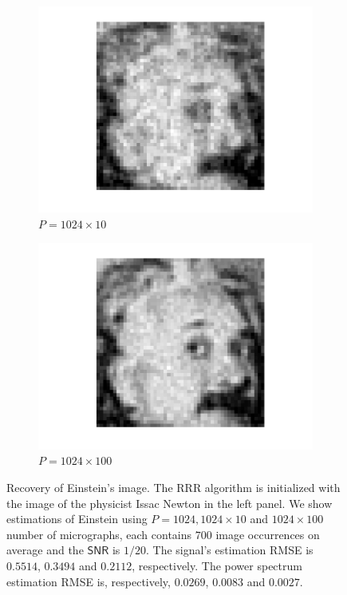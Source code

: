 \documentclass[english,11pt]{article}
\newcommand{\TODO}[1]{{\color{red}{[#1]}}}
\numberwithin{equation}{section}
\theoremstyle{plain}
\theoremstyle{definition}
\theoremstyle{remark}
\theoremstyle{plain}
\theoremstyle{remark}
\theoremstyle{plain}
\theoremstyle{plain}
\newcommand{\SNR}{{\textsf{SNR}}}
\begin{document}
\begin{figure}[h!]
\begin{subfigure}[h]{0.25\textwidth}
		\includegraphics[scale=0.3]{reconstruction20}
		\caption{$P = 1024\times 10$}
	\end{subfigure}%
	\begin{subfigure}[h]{0.25\textwidth}
		\centering
		\includegraphics[scale=0.3]{reconstruction200}
		\caption{$P = 1024\times 100$}
	\end{subfigure}%
	\caption{\label{fig:Einst_example} Recovery of Einstein's image. The RRR algorithm is initialized with the image of the physicist Issac Newton in the left panel. We show estimations of Einstein using $P=1024,1024\times 10$ and $1024\times 100$ number of micrographs, each contains $700$ image occurrences on average and the $\SNR$ is $1/20$. The signal's estimation RMSE is $0.5514$, $0.3494$ and $0.2112$, respectively. The power spectrum estimation RMSE is, respectively, $0.0269 $, $0.0083$ and $0.0027$. \TODO{Can add more images to exemplify the progress}}	
\end{figure}
\end{document}
